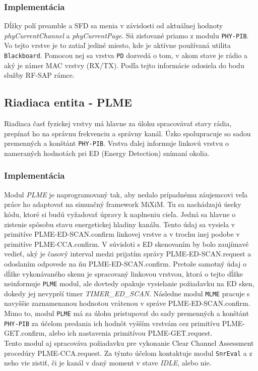 \subsubsection{Implementácia}
\indent\indent Dĺžky polí preamble a SFD sa menia v závislosti od aktuálnej hodnoty \textit{phyCurrentChannel} a \textit{phyCurrentPage}. Sú zisťované priamo z modulu \texttt{PHY-PIB}. Vo tejto vrstve je to zatiaľ jediné miesto, kde je aktívne používaná utilita \texttt{Blackboard}. Pomocou nej sa vrstva \texttt{PD} dozvedá o tom, v akom stave je rádio a aký je zámer MAC vrstvy (RX/TX). Podľa tejto informácie odosiela do bodu služby RF-SAP rámce.\\

\subsection{Riadiaca entita - PLME}
\indent\indent Riadiaca časť fyzickej vrstvy má hlavne za úlohu spracovávať stavy rádia, prepínať ho na správnu frekvenciu a správny kanál. Úzko spolupracuje so sadou premenných a konštánt \texttt{PHY-PIB}. Vrstva ďalej informuje linkovú vrstvu o nameraných hodnotách pri ED (Energy Detection) snímaní okolia.\\

\subsubsection{Implementácia}
\indent\indent Modul \textit{PLME} je naprogramovaný tak, aby nedalo prípadnému záujemcovi veľa práce ho adaptovať na simuačný framework MiXiM. Tu sa nachádzajú úseky kódu, ktoré si budú vyžadovať úpravy k naplneniu cieľa. Jedná sa hlavne o zistenie spôsobu stavu energetickej hladiny kanálu. Tento údaj sa vysiela v primitíve PLME-ED-SCAN.confirm linkovej vrstve a v trochu inej podobe v primitíve PLME-CCA.confirm. V súvisloti s ED skenovaním by bolo zaujímavé vedieť, aký je časový interval medzi prijatím správy PLME-ED-SCAN.request a odoslaním odpovede na ňu PLME-ED-SCAN.confirm. Pretože samotný údaj o dĺžke vykonávaného skenu je spracovaný linkovou vrstvou, ktorá o tejto dĺžke neinformuje \texttt{PLME} modul, ale dovtedy opakuje vysielanie požiadavku na ED sken, dokedy jej nevyprší timer \textit{TIMER\_ED\_SCAN}. Následne modul \texttt{MLME} pracuje s navyššie zaznamenanou hodnotou vrátenou v správe PLME-ED-SCAN.confirm. Mimo to, modul \texttt{PLME} má za úlohu pristupovať do sady premenných a konštánt \texttt{PHY-PIB} za účelom predania ich hodnôt vyšším vrstvám cez primitívu PLME-GET.confirm, alebo ich nastavenia primitívou PLME-GET.request.\\
\indent\indent Tento modul aj spracováva požiadavku pre vykonanie Clear Channel Assessment procedúry PLME-CCA.request. Za týmto účelom kontaktuje modul \texttt{SnrEval} a z neho vie zistiť, či je kanál v daný moment v stave \textit{IDLE}, alebo nie.\\

